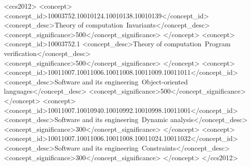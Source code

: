\documentclass[acmsmall,review,anonymous]{acmart}\settopmatter{printfolios=true,printccs=false,printacmref=false}
\begin{document}
\begin{CCSXML}
	<ccs2012>
	<concept>
	<concept_id>10003752.10010124.10010138.10010139</concept_id>
	<concept_desc>Theory of computation~Invariants</concept_desc>
	<concept_significance>500</concept_significance>
	</concept>
	<concept>
	<concept_id>10003752.1
	<concept_desc>Theory of computation~Program verification</concept_desc>
	<concept_significance>500</concept_significance>
	</concept>
	<concept>
	<concept_id>10011007.10011006.10011008.10011009.10011011</concept_id>
	<concept_desc>Software and its engineering~Object-oriented languages</concept_desc>
	<concept_significance>500</concept_significance>
	</concept>
	<concept>
	<concept_id>10011007.10010940.10010992.10010998.10011001</concept_id>
	<concept_desc>Software and its engineering~Dynamic analysis</concept_desc>
	<concept_significance>300</concept_significance>
	</concept>
	<concept>
	<concept_id>10011007.10011006.10011008.10011024.10011032</concept_id>
	<concept_desc>Software and its engineering~Constraints</concept_desc>
	<concept_significance>300</concept_significance>
	</concept>
	</ccs2012>
\end{CCSXML}





\maketitle




\end{document}
